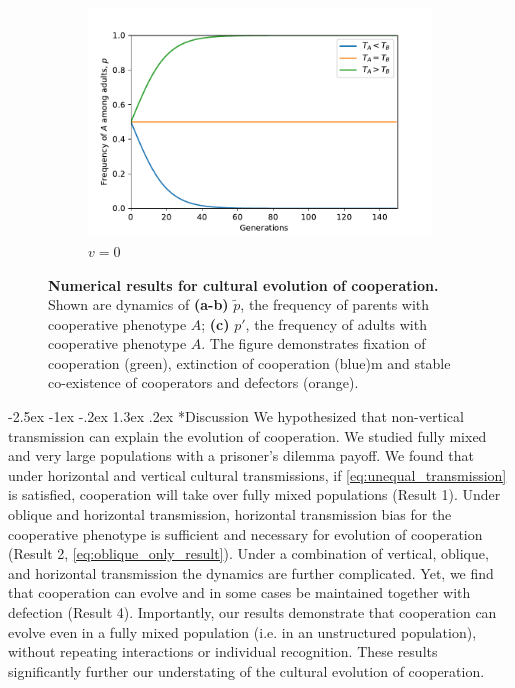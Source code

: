 \documentclass[12pt]{extarticle}
\makeatletter
\renewcommand\section{\@startsection {section}{1}{\z@}%
     {-2.5ex \@plus -1ex \@minus -.2ex}%
     {1.3ex \@plus.2ex}%
    {\Large\bfseries}}
\makeatother
\begin{document}
{\begin{figure}[H]
  \begin{subfigure}{8cm}
    \includegraphics[scale=0.5]{figure2c.pdf}
    \caption{$v=0$}
    \label{fig:results_c}
  \end{subfigure}
  \label{fig:results}
  \caption{
  \textbf{Numerical results for cultural evolution of cooperation.}
  Shown are dynamics of \textbf{(a-b)} $\tilde{p}$, the frequency of parents with cooperative phenotype $A$; \textbf{(c)} $p'$, the frequency of adults with cooperative phenotype $A$.
  The figure demonstrates fixation of cooperation (green), extinction of cooperation (blue)m and stable co-existence of cooperators and defectors (orange).
  }
\end{figure}


\section*{Discussion}
We hypothesized that non-vertical transmission can explain the evolution of cooperation.
We studied fully mixed and very large populations with a prisoner's dilemma payoff. 
We found that under horizontal and vertical cultural transmissions, if \autoref{eq:unequal_transmission} is satisfied, cooperation will take over fully mixed populations (Result 1).
Under oblique and horizontal transmission, horizontal transmission bias for the cooperative phenotype is sufficient and necessary for evolution of cooperation (Result 2, \autoref{eq:oblique_only_result}).
Under a combination of vertical, oblique, and horizontal transmission the dynamics are further complicated. Yet, we find that cooperation can evolve and in some cases be maintained together with defection (Result 4). 
Importantly, our results demonstrate that cooperation can evolve even in a fully mixed population (i.e. in an unstructured population), without repeating interactions or individual recognition.
These results significantly further our understating of the cultural evolution of cooperation. 

}
\end{document}
